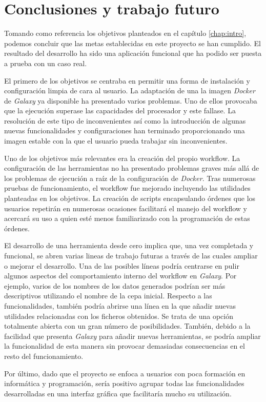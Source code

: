 \chapter{Conclusiones y trabajo futuro}
\label{chap:conclusiones}
Tomando como referencia los objetivos planteados en el capítulo \ref{chap:intro}, podemos concluir que las metas establecidas en este proyecto se han cumplido. El resultado del desarrollo ha sido una aplicación funcional que ha podido ser puesta a prueba con un caso real.

El primero de los objetivos se centraba en permitir una forma de instalación y configuración limpia de cara al usuario. La adaptación de una la imagen \textit{Docker} de \textit{Galaxy} ya disponible ha presentado varios problemas. Uno de ellos provocaba que la ejecución superase las capacidades del procesador y este fallase. La resolución de este tipo de inconvenientes así como la introducción de algunas nuevas funcionalidades y configuraciones han terminado proporcionando una imagen estable con la que el usuario pueda trabajar sin inconvenientes.

Uno de los objetivos más relevantes era la creación del propio workflow. La configuración de las herramientas no ha presentado problemas graves más allá de los problemas de ejecución a raíz de la configuración de \textit{Docker}. Tras numerosas pruebas de funcionamiento, el workflow fue mejorado incluyendo las utilidades planteadas en los objetivos. La creación de scripts encapsulando órdenes que los usuarios repetirán en numerosas ocasiones facilitará el manejo del workflow y acercará su uso a quien esté menos familiarizado con la programación de estas órdenes.

El desarrollo de una herramienta desde cero implica que, una vez completada y funcional, se abren varias lineas de trabajo futuras a través de las cuales ampliar o mejorar el desarrollo. Una de las posibles líneas podría centrarse en pulir algunos aspectos del comportamiento interno del workflow en \textit{Galaxy}. Por ejemplo, varios de los nombres de los datos generados podrían ser más descriptivos utilizando el nombre de la cepa inicial. Respecto a las funcionalidades, también podría abrirse una línea en la que añadir nuevas utilidades relacionadas con los ficheros obtenidos. Se trata de una opción totalmente abierta con un gran número de posibilidades. También, debido a la facilidad que presenta \textit{Galaxy} para añadir nuevas herramientas, se podría ampliar la funcionalidad de esta manera sin provocar demasiadas consecuencias en el resto del funcionamiento.

Por último, dado que el proyecto se enfoca a usuarios con poca formación en informática y programación, sería positivo agrupar todas las funcionalidades desarrolladas en una interfaz gráfica que facilitaría mucho su utilización.

\newpage \thispagestyle{empty} %